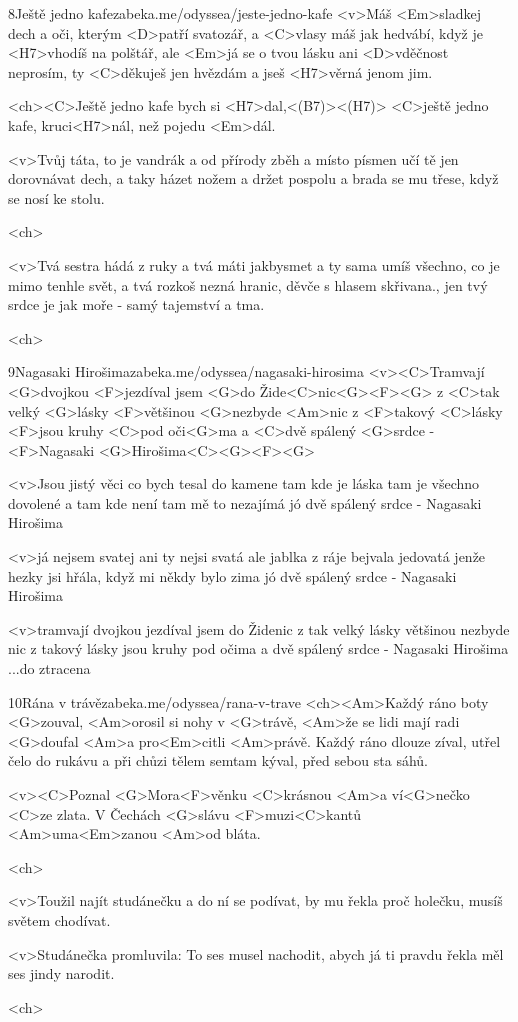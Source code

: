 \begin{song}{8}{Ještě jedno kafe}{zabeka.me/odyssea/jeste-jedno-kafe}
	<v>Máš <Em>sladkej dech a oči, kterým <D>patří svatozář,
	a <C>vlasy máš jak hedvábí, když je <H7>vhodíš na polštář,
	ale <Em>já se o tvou lásku ani <D>vděčnost neprosím,
	ty <C>děkuješ jen hvězdám a jseš <H7>věrná jenom jim.

	<ch><C>Ještě jedno kafe bych si <H7>dal,<(B7)><(H7)>
	<C>ještě jedno kafe, kruci<H7>nál, než pojedu <Em>dál.

	<v>Tvůj táta, to je vandrák a od přírody zběh
	a místo písmen učí tě jen dorovnávat dech,
	a taky házet nožem a držet pospolu
	a brada se mu třese, když se nosí ke stolu.

	<ch>

	<v>Tvá sestra hádá z ruky a tvá máti jakbysmet
	a ty sama umíš všechno, co je mimo tenhle svět,
	a tvá rozkoš nezná hranic, děvče s hlasem skřivana.,
	jen tvý srdce je jak moře - samý tajemství a tma.

	<ch>
\end{song}
\begin{song}{9}{Nagasaki Hirošima}{zabeka.me/odyssea/nagasaki-hirosima}
	<v><C>Tramvají <G>dvojkou <F>jezdíval jsem <G>do Žide<C>nic<G><F><G>
	z <C>tak velký <G>lásky <F>většinou <G>nezbyde <Am>nic
	z <F>takový <C>lásky <F>jsou kruhy <C>pod oči<G>ma
	a <C>dvě spálený <G>srdce - <F>Nagasaki <G>Hirošima<C><G><F><G>

	<v>Jsou jistý věci co bych tesal do kamene
	tam kde je láska tam je všechno dovolené
	a tam kde není tam mě to nezajímá
	jó dvě spálený srdce - Nagasaki Hirošima

	<v>já nejsem svatej ani ty nejsi svatá
	ale jablka z ráje bejvala jedovatá
	jenže hezky jsi hřála, když mi někdy bylo zima
	jó dvě spálený srdce - Nagasaki Hirošima

	<v>tramvají dvojkou jezdíval jsem do Židenic
	z tak velký lásky většinou nezbyde nic
	z takový lásky jsou kruhy pod očima
	a dvě spálený srdce - Nagasaki Hirošima ...do ztracena
\end{song}
\begin{song}{10}{Rána v trávě}{zabeka.me/odyssea/rana-v-trave}
	<ch><Am>Každý ráno boty <G>zouval,
	<Am>orosil si nohy v <G>trávě,
	<Am>že se lidi mají radi <G>doufal
	<Am>a pro<Em>citli <Am>právě.
	Každý ráno dlouze zíval,
	utřel čelo do rukávu
	a při chůzi tělem semtam kýval,
	před sebou sta sáhů.

	<v><C>Poznal <G>Mora<F>věnku <C>krásnou
	<Am>a ví<G>nečko <C>ze zlata.
	V Čechách <G>slávu <F>muzi<C>kantů
	<Am>uma<Em>zanou <Am>od bláta.

	<ch>

	<v>Toužil najít studánečku
	a do ní se podívat,
	by mu řekla proč holečku,
	musíš světem chodívat.

	<v>Studánečka promluvila:
	To ses musel nachodit,
	abych já ti pravdu řekla
	měl ses jindy narodit.

	<ch>
\end{song}
